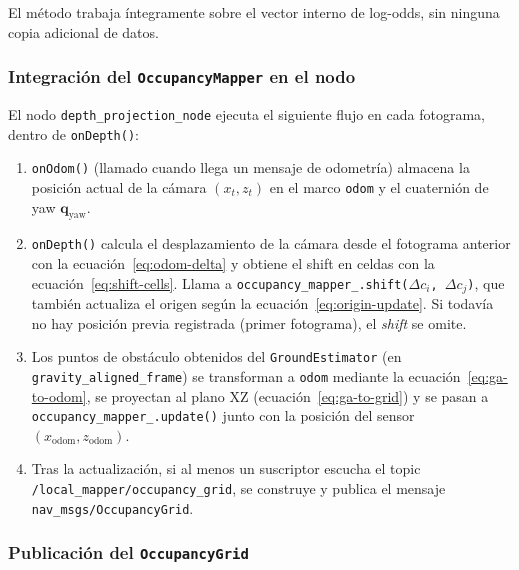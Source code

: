 El método trabaja íntegramente sobre el vector interno de log-odds, sin
ninguna copia adicional de datos.

\subsubsection{Integración del \texttt{OccupancyMapper} en el nodo}
\label{subsubsec:lm-v5-transform-node}

El nodo \texttt{depth\_projection\_node} ejecuta el siguiente flujo en cada
fotograma, dentro de \texttt{onDepth()}:

\begin{enumerate}
  \item \texttt{onOdom()} (llamado cuando llega un mensaje de odometría)
    almacena la posición actual de la cámara $(x_t, z_t)$ en el marco
    \texttt{odom} y el cuaternión de yaw $\mathbf{q}_{\text{yaw}}$.

  \item \texttt{onDepth()} calcula el desplazamiento de la cámara desde el
    fotograma anterior con la ecuación~\ref{eq:odom-delta} y obtiene el shift
    en celdas con la ecuación~\ref{eq:shift-cells}. Llama a
    \texttt{occupancy\_mapper\_.shift($\Delta c_i$, $\Delta c_j$)}, que
    también actualiza el origen según la ecuación~\ref{eq:origin-update}.
    Si todavía no hay posición previa registrada (primer fotograma), el
    \emph{shift} se omite.

  \item Los puntos de obstáculo obtenidos del \texttt{GroundEstimator}
    (en \texttt{gravity\_aligned\_frame}) se transforman a \texttt{odom}
    mediante la ecuación~\ref{eq:ga-to-odom}, se proyectan al plano XZ
    (ecuación~\ref{eq:ga-to-grid}) y se pasan a
    \texttt{occupancy\_mapper\_.update()} junto con la posición del sensor
    $(x_{\text{odom}}, z_{\text{odom}})$.

  \item Tras la actualización, si al menos un suscriptor escucha el topic
    \texttt{/local\_mapper/occupancy\_grid}, se construye y publica el mensaje
    \texttt{nav\_msgs/OccupancyGrid}.
\end{enumerate}

\subsubsection{Publicación del \texttt{OccupancyGrid}}
\label{subsubsec:lm-v5-occgrid}

